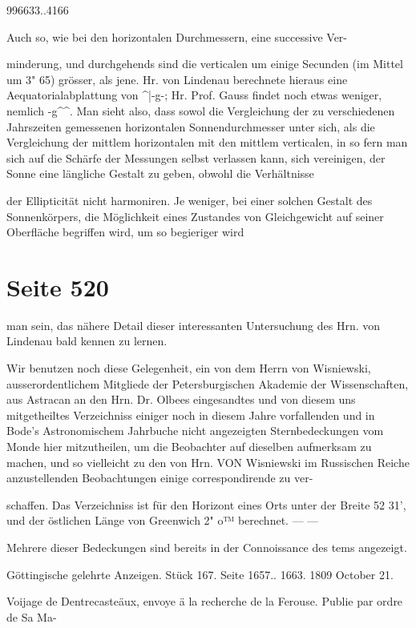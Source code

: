 \documentclass[10pt,a4paper]{article}
\begin{document}
996633..4166

Auch so, wie bei den horizontalen Durchmessern, eine successive Ver-

minderung, und durchgehends sind die verticalen um einige Secunden (im Mittel um 3" 65) grösser, als jene. Hr. von Lindenau berechnete hieraus eine Aequatorialabplattung von \textasciicircum{}|-g-; Hr. Prof. Gauss findet noch etwas weniger, nemlich -g\textasciicircum{}\textasciicircum{}. Man sieht also, dass sowol die Vergleichung der zu verschiedenen Jahrszeiten gemessenen horizontalen Sonnendurchmesser unter sich, als die Vergleichung der mittlem horizontalen mit den mittlem verticalen, in so fern man sich auf die Schärfe der Messungen selbst verlassen kann, sich vereinigen, der Sonne eine längliche Gestalt zu geben, obwohl die Verhältnisse

der Ellipticität nicht harmoniren. Je weniger, bei einer solchen Gestalt des Sonnenkörpers, die Möglichkeit eines Zustandes von Gleichgewicht auf seiner Oberfläche begriffen wird, um so begieriger wird


\newpage
\section*{Seite 520}
man sein, das nähere Detail dieser interessanten Untersuchung des Hrn. von Lindenau bald kennen zu lernen.

Wir benutzen noch diese Gelegenheit, ein von dem Herrn von Wisniewski, ausserordentlichem Mitgliede der Petersburgischen Akademie der Wissenschaften, aus Astracan an den Hrn. Dr. Olbees eingesandtes und von diesem uns mitgetheiltes Verzeichniss einiger noch in diesem Jahre vorfallenden und in Bode's Astronomischem Jahrbuche nicht angezeigten Sternbedeckungen vom Monde hier mitzutheilen, um die Beobachter auf dieselben aufmerksam zu machen, und so vielleicht zu den von Hrn. VON Wisniewski im Russischen Reiche anzustellenden Beobachtungen einige correspondirende zu ver-

schaffen. Das Verzeichniss ist für den Horizont eines Orts unter der Breite 52\textdegree{} 31', und der östlichen Länge von Greenwich 2" o™ berechnet. — —

Mehrere dieser Bedeckungen sind bereits in der Connoissance des tems angezeigt.

Göttingische gelehrte Anzeigen. Stück 167. Seite 1657.. 1663. 1809 October 21.

Voijage de Dentrecasteäux, envoye ä la recherche de la Ferouse. Publie par ordre de Sa Ma-
\end{document}
